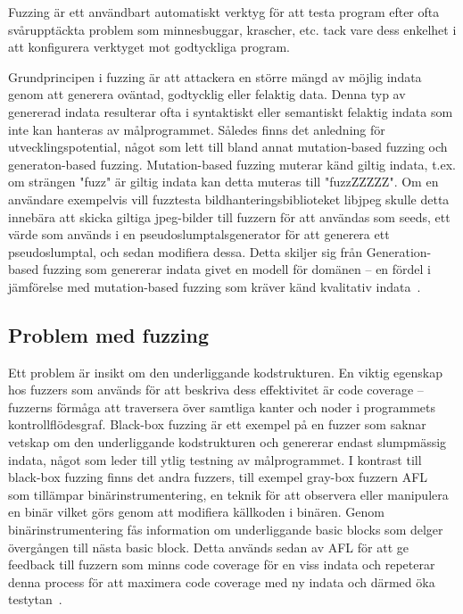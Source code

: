 Fuzzing är ett användbart automatiskt verktyg för att testa program efter
ofta svårupptäckta problem som minnesbuggar, krascher, etc. tack vare dess
enkelhet i att konfigurera verktyget mot godtyckliga program.  

Grundprincipen i fuzzing är att attackera en större mängd av möjlig indata genom
att generera oväntad, godtycklig eller felaktig data. Denna typ av genererad
indata resulterar ofta i syntaktiskt eller semantiskt felaktig indata som inte
kan hanteras av målprogrammet. Således finns det anledning för
utvecklingspotential, något som lett till bland annat mutation-based fuzzing och
generaton-based fuzzing. Mutation-based fuzzing muterar känd giltig indata,
t.ex. om strängen "fuzz" är giltig indata kan detta muteras till "fuzzZZZZZ". Om
en användare exempelvis vill fuzztesta bildhanteringsbiblioteket libjpeg skulle
detta innebära att skicka giltiga jpeg-bilder till fuzzern för att användas som
seeds, ett värde som används i en pseudoslumptalsgenerator för att generera ett
pseudoslumptal, och sedan modifiera dessa. Detta skiljer sig från
Generation-based fuzzing som genererar indata givet en modell för domänen -- en
fördel i jämförelse med mutation-based fuzzing som kräver känd kvalitativ
indata~\cite{fuzzing}. 

\subsection{Problem med fuzzing}
Ett problem är insikt om den underliggande kodstrukturen. En
viktig egenskap hos fuzzers som används för att beskriva dess effektivitet är
code coverage -- fuzzerns förmåga att traversera över samtliga kanter och noder i programmets
kontrollflödesgraf. Black-box fuzzing är ett exempel på en fuzzer
som saknar vetskap om den underliggande kodstrukturen och genererar
endast slumpmässig indata, något som leder till ytlig testning av målprogrammet.
I kontrast till black-box fuzzing finns det andra fuzzers, till exempel gray-box
fuzzern AFL~\cite{aflplusplus} som tillämpar binärinstrumentering, en teknik för att observera
eller manipulera en binär vilket görs genom att modifiera källkoden i binären.
Genom binärinstrumentering fås information om underliggande basic blocks som
delger övergången till nästa basic block. Detta används sedan av AFL för att ge
feedback till fuzzern som minns code coverage för en viss indata och repeterar
denna process för att maximera code coverage med ny indata och därmed öka
testytan~\cite{challenges_fuzzing}.


